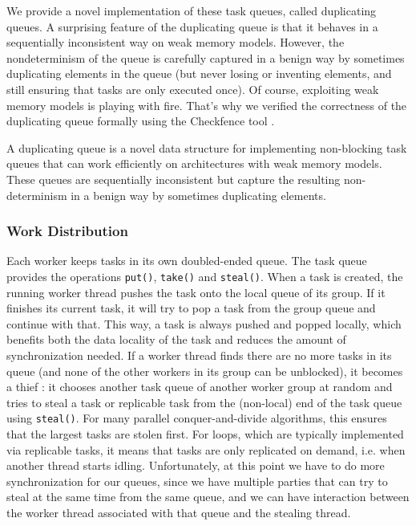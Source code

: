 We provide a novel implementation of these task queues, called
duplicating queues. A surprising feature of the duplicating queue is
that it behaves in a sequentially inconsistent way on weak memory
models. However, the nondeterminism of the queue is carefully captured
in a benign way by sometimes duplicating elements in the queue (but
never losing or inventing elements, and still ensuring that tasks are
only executed once). Of course, exploiting weak memory models is
playing with fire. That's why we verified the correctness of the
duplicating queue formally using the Checkfence tool
\cite{Burckhardt2007, Burckhardt2007a}.

A duplicating queue is a novel data structure for implementing
non-blocking task queues that can work efficiently on architectures
with weak memory models. These queues are sequentially inconsistent
but capture the resulting non-determinism in a benign way by sometimes
duplicating elements.

\subsubsection{Work Distribution}

Each worker keeps tasks in its own doubled-ended queue. The task queue
provides the operations \lstinline!put()!, \lstinline!take()! and
\lstinline!steal()!. When a task is created, the running worker thread
pushes the task onto the local queue of its group. If it finishes its
current task, it will try to pop a task from the group queue and
continue with that. This way, a task is always pushed and popped
locally, which benefits both the data locality of the task and reduces
the amount of synchronization needed. If a worker thread finds there
are no more tasks in its queue (and none of the other workers in its
group can be unblocked), it becomes a thief : it chooses another task
queue of another worker group at random and tries to steal a task or
replicable task from the (non-local) end of the task queue using
\lstinline!steal()!. For many parallel conquer-and-divide algorithms,
this ensures that the largest tasks are stolen first. For loops, which
are typically implemented via replicable tasks, it means that tasks
are only replicated on demand, i.e. when another thread starts
idling. Unfortunately, at this point we have to do more
synchronization for our queues, since we have multiple parties that
can try to steal at the same time from the same queue, and we can have
interaction between the worker thread associated with that queue and
the stealing thread.


